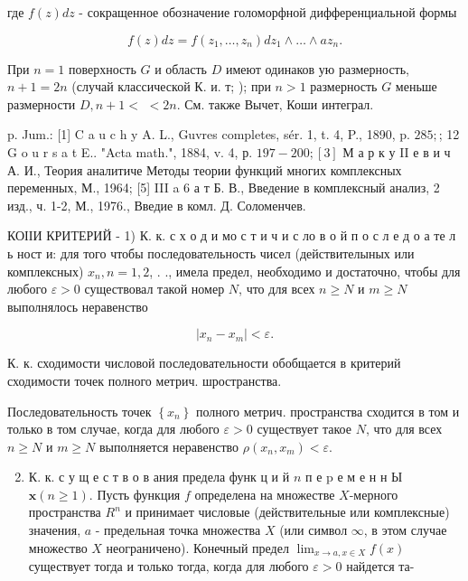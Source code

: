 \documentclass[10pt]{article}
\begin{document}
где $f(z) d z$ - сокращенное обозначение голоморфной дифференциальной формы



\[

f(z) d z=f\left(z_{1}, \ldots, z_{n}\right) d z_{1} \wedge \ldots \wedge a z_{n} .

\]



При $n=1$ поверхность $G$ и область $D$ имеют одинаков ую размерность, $n+1=2 n$ (случай классической К. и. т; ); при $n>1$ размерность $G$ меньше размерности $D, n+1<$ $<2 n$. См. также Вычет, Коши интеграл.



p. Jum.: [1] C a u c h y A. L., Guvres completes, sér. 1, t. 4, P., 1890, p. $285 ;$; 12 G o u r s a t E.. "Acta math.", 1884, v. 4, р. $197-200 ;[3]$ М а р к у II е в и ч А. И., Теория аналитиче Методы теории функций многих комплексных переменных, М., 1964; [5] III a 6 а т Б. В., Введение в комплексный анализ, 2 изд., ч. 1-2, М., 1976., Введие в комл. Д. Соломенчев.



КОІІИ КРИТЕРИЙ - 1) К. к. с х о д и мо с т и ч и с ло в о й п о с л е д о а те л ь ност и: для того чтобы последовательность чисел (действителыных или комплексных) $x_{n}, n=1,2$, . ., имела предел, необходимо и достаточно, чтобы для любого $\varepsilon>0$ существовал такой номер $N$, что для всех $n \geqslant N$ и $m \geqslant N$ выполнялось неравенство



\[

\left|x_{n}-x_{m}\right|<\varepsilon .

\]



К. к. сходимости числовой последовательности обобщается в критерий сходимости точек полного метрич. шространства.



Последовательность точек $\left\{x_{n}\right\}$ полного метрич. пространства сходится в том и только в том случае, когда для любого $\varepsilon>0$ существует такое $N$, что для всех $n \geqslant N$ и $m \geqslant N$ выполняется неравенство $\rho\left(x_{n}, x_{m}\right)<\varepsilon$.



\begin{enumerate}

  \setcounter{enumi}{1}

  \item К. к. с у щ е с т в о в ания предела функ ц и й $n$ п е p е м е н н Ы $\mathbf{x}(n \geqslant 1)$. Пусть функция $f$ определена на множестве $X$-мерного пространства $R^{n}$ и принимает числовые (действительные или комплексные) значения, $a$ - предельная точка множества $X$ (или символ $\infty$, в этом случае множество $X$ неограничено). Конечный предел $\lim _{x \rightarrow a, x \in X} f(x)$ существует тогда и только тогда, когда для любого $\varepsilon>0$ найдется та-

\end{enumerate}
\end{document}
